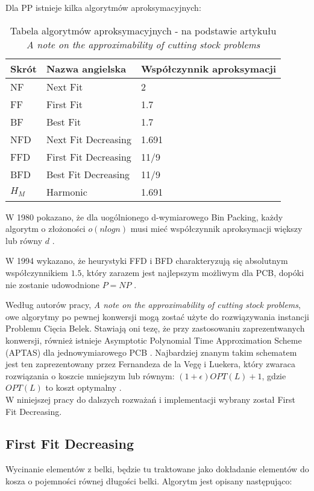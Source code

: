 Dla PP istnieje kilka algorytmów aproksymacyjnych: 

\begin{table}[!h]
\begin{center}
	\begin{tabular}{ |p{3cm}||p{5cm}|p{3cm}|  }
		\hline
		Skrót & Nazwa angielska & Współczynnik aproksymacji\\
		\hline
		NF   & Next Fit & 2\\
		FF & First Fit & 1.7\\
		BF & Best Fit & 1.7\\
		NFD & Next Fit Decreasing &  1.691\\
		FFD & First Fit Decreasing & 11/9\\
		BFD & Best Fit Decreasing & 11/9\\
		$H_M$ & Harmonic & 1.691\\	
		\hline
	\end{tabular}
	\caption{\label{APPROX_RATIOS}Tabela algorytmów aproksymacyjnych - na podstawie artykułu \textit{A note on the approximability of cutting stock problems} }
\end{center}
\end{table}

W 1980 pokazano, że dla uogólnionego d-wymiarowego Bin Packing, każdy algorytm o złożoności $o(nlogn)$ musi mieć współczynnik aproksymacji większy lub równy $d$ \cite{APPROX_RATIO}.

W 1994 wykazano, że heurystyki FFD i BFD charakteryzują się absolutnym współczynnikiem $1.5$, który zarazem jest najlepszym możliwym dla PCB, dopóki nie zostanie udowodnione $P=NP$ \cite{WORST_CASE_APPROX}.

Według autorów pracy, \textit{A note on the approximability of cutting stock problems}, owe algorytmy po pewnej konwersji mogą zostać użyte do rozwiązywania instancji Problemu Cięcia Belek. Stawiają oni tezę, że przy zastosowaniu zaprezentwanych konwersji, również istnieje Asymptotic Polynomial Time Approximation Scheme (APTAS) dla jednowymiarowego PCB \cite{NOTE_ON_APPROX}.
Najbardziej znanym takim schematem jest ten zaprezentowany przez Fernandeza de la Vegę i Luekera, który zwaraca rozwiązania o koszcie mniejszym lub równym: $(1+\epsilon)OPT(L) + 1$, gdzie $OPT(L)$ to koszt optymalny \cite{APTAS}. \\

W niniejszej pracy do dalszych rozważań i implementacji wybrany został First Fit Decreasing.

\subsection{First Fit Decreasing}
Wycinanie elementów z belki, będzie tu traktowane jako dokładanie elementów do kosza o pojemności równej długości belki.
Algorytm jest opisany następująco:


